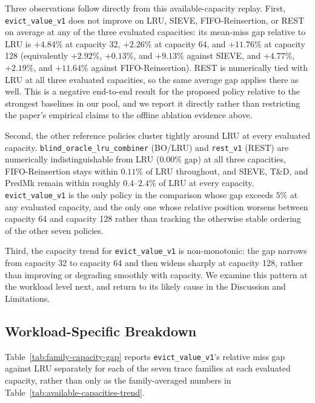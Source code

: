 \documentclass[preprint,12pt]{elsarticle}
\begin{document}
Three observations follow directly from this available-capacity replay. First, \texttt{evict\_value\_v1} does not improve on LRU, SIEVE, FIFO-Reinsertion, or REST on average at any of the three evaluated capacities: its mean-miss gap relative to LRU is $+4.84\%$ at capacity 32, $+2.26\%$ at capacity 64, and $+11.76\%$ at capacity 128 (equivalently $+2.92\%$, $+0.13\%$, and $+9.13\%$ against SIEVE, and $+4.77\%$, $+2.19\%$, and $+11.64\%$ against FIFO-Reinsertion). REST is numerically tied with LRU at all three evaluated capacities, so the same average gap applies there as well. This is a negative end-to-end result for the proposed policy relative to the strongest baselines in our pool, and we report it directly rather than restricting the paper's empirical claims to the offline ablation evidence above.

Second, the other reference policies cluster tightly around LRU at every evaluated capacity. \texttt{blind\_oracle\_lru\_combiner} (BO/LRU) and \texttt{rest\_v1} (REST) are numerically indistinguishable from LRU ($0.00\%$ gap) at all three capacities, FIFO-Reinsertion stays within $0.11\%$ of LRU throughout, and SIEVE, T\&D, and PredMk remain within roughly $0.4$--$2.4\%$ of LRU at every capacity. \texttt{evict\_value\_v1} is the only policy in the comparison whose gap exceeds $5\%$ at any evaluated capacity, and the only one whose relative position worsens between capacity 64 and capacity 128 rather than tracking the otherwise stable ordering of the other seven policies.

Third, the capacity trend for \texttt{evict\_value\_v1} is non-monotonic: the gap narrows from capacity 32 to capacity 64 and then widens sharply at capacity 128, rather than improving or degrading smoothly with capacity. We examine this pattern at the workload level next, and return to its likely cause in the Discussion and Limitations.

\subsection{Workload-Specific Breakdown}
\label{subsec:workload_breakdown}

Table~\ref{tab:family-capacity-gap} reports \texttt{evict\_value\_v1}'s relative miss gap against LRU separately for each of the seven trace families at each evaluated capacity, rather than only as the family-averaged numbers in Table~\ref{tab:available-capacities-trend}.
\end{document}
